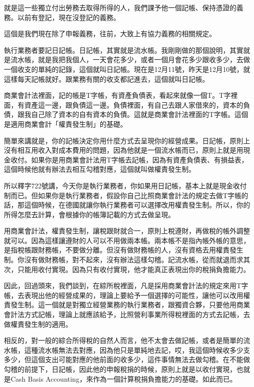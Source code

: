 \documentclass[oneside,sub3section]{ctexbook}
\begin{document}
就是這一些獨立付出勞務去取得所得的人，我們課予他一個記帳、保持憑證的義務。以前有登記，現在沒登記的義務。

這個是我們現在除了申報義務，往前，大致上有協力義務的相關規定。

執行業務者要記日記帳。日記帳，其實就是流水帳。我剛剛做的那個說明，其實就是流水帳，就是我把我個人，一天會花多少，或者一個月會花多少跟收多少，去做一個收支的單純的記錄，這個就叫日記帳。現在是12月11號，昨天是12月10號，就這樣每天記帳就好。跟業務有關的收支都記進去，這個就叫日記帳。

商業會計法裡面，記的帳是T字帳，有資產負債表，看起來就像一個T。T字裡面，有資產這一邊，跟負債這一邊。負債裡面，有自己去跟人家借來的，資本的負債，跟我自己除了資本的自有資本的負債。這就是商業會計法裡面的T字帳。這個是適用商業會計「權責發生制」的基礎。

簡單來講就是，你的記帳決定你用什麼方式去呈現你的經營成果。日記帳，原則上沒有相互用收入對成本費用的問題，因為他就是一個流水帳而已，原則上就是用現金收付。如果你是用商業會計法用T字帳去記帳，因為有資產負債表、有損益表，這個時候他就有辦法去相互勾稽對應，這個就叫做權責發生制。

所以釋字722號講，今天你是執行業務者，你如果用日記帳，基本上就是現金收付制而已。但如果你是執行業務者，假設你自己比照商業會計法的規定去做T字帳的話，那這個時候，在德國就讓你執行業務者可以選擇改用權責發生制。所以，你的所得怎麼去計算，會根據你的帳簿記載的方式去做呈現。

用商業會計法，權責發生制，讓稅跟財就合一，原則上稅遵財，再做稅的帳外調整就可以。因為這樣讓遵財的人可以不用做兩本帳。兩本帳不是指內帳外帳的意思，是指稅帳跟財務帳，不要做分離。但沒有做財務帳的人，沒有資格去用權責發生制。你沒有做財務帳，對不起來，沒有辦法這樣勾稽。記流水帳，從而就退而求其次，只能用收付實現。因為只有收付實現，他才能真正表現出你的稅捐負擔能力。

因此，回過頭來，我們談到，在綜所稅裡面，凡是採用商業會計法的規定來用T字帳，去表現出他的經營成果的，理論上要給予一個選擇的可能性，讓他可以改用權責發生制。這一個就是對獨立經營業務的執行業務者，跟獨資合夥，只要他用商業會計法方式記帳，理論上就應該給予，比照營利事業所得稅裡面的方式去記帳，去做權責發生制的適用。

相反的，對一般的綜合所得稅的自然人而言，他不太會去做記帳，或者是簡單的流水帳，這種流水帳無法去對應，因為他只是單純地去記，哎，我這個時候收多少支多少，但這個支出可能對應的他前面的收多少，這件事情無法去做勾稽。在不能做勾稽的前提下，日記帳，因此他的申報稅捐的時候，原則上就是以收付實現，也就是Cash Basis Accounting，來作為一個計算稅捐負擔能力的基礎。如此而已。
\end{document}
